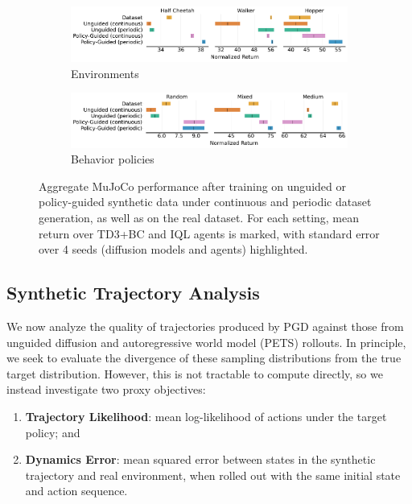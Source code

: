 \documentclass[10pt]{article} %
\theoremstyle{plain}
\theoremstyle{definition}
\theoremstyle{remark}
\begin{document}
\begin{figure}[h]
    \centering
    \begin{subfigure}{\linewidth}
        \centering
        \includegraphics[width=\linewidth]{figs/env_scores.pdf}
        \vspace{-1.75em}
        \caption{Environments}
    \end{subfigure}
    \vspace{.75em}
    \newline
    \begin{subfigure}{\linewidth}
        \centering
        \includegraphics[width=\linewidth]{figs/dataset_scores.pdf}
        \vspace{-1.75em}
        \caption{Behavior policies}
    \end{subfigure}
    \caption{Aggregate MuJoCo performance after training on unguided or policy-guided synthetic data under continuous and periodic dataset generation, as well as on the real dataset. For each setting, mean return over TD3+BC and IQL agents is marked, with standard error over 4 seeds (diffusion models and agents) highlighted.}
    \label{fig:agg-scores}
\end{figure}






\subsection{\label{sec:analysis}Synthetic Trajectory Analysis}

We now analyze the quality of trajectories produced by PGD against those from unguided diffusion and autoregressive world model (PETS) rollouts.
In principle, we seek to evaluate the divergence of these sampling distributions from the true target distribution.
However, this is not tractable to compute directly, so we instead investigate two proxy objectives:
\begin{enumerate}
    \item \textbf{Trajectory Likelihood}: mean log-likelihood of actions under the target policy; and
    \item \textbf{Dynamics Error}: mean squared error between states in the synthetic trajectory and real environment, when rolled out with the same initial state and action sequence.
\end{enumerate}
\end{document}
